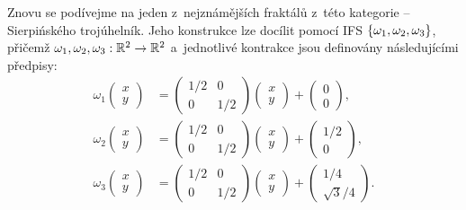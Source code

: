 Znovu se podívejme na jeden z~nejznámějších fraktálů z~této kategorie -- Sierpińského trojúhelník. Jeho konstrukce lze docílit pomocí IFS $\left\{\omega_1,\omega_2,\omega_3\right\}$, přičemž $\omega_1,\omega_2,\omega_3:\mathbb{R}^2 \rightarrow \mathbb{R}^2$ a~jednotlivé kontrakce jsou definovány následujícími předpisy:
\begin{align*}
    \omega_1\left(\begin{matrix}
        x\\
        y
    \end{matrix}\right)&=\left(\begin{matrix}
        1/2 & 0\\
        0 & 1/2
    \end{matrix}\right)\left(\begin{matrix}
        x\\
        y
    \end{matrix}\right)+\left(\begin{matrix}
        0\\
        0
    \end{matrix}\right),\\
    \omega_2\left(\begin{matrix}
        x\\
        y
    \end{matrix}\right)&=\left(\begin{matrix}
        1/2 & 0\\
        0 & 1/2
    \end{matrix}\right)\left(\begin{matrix}
        x\\
        y
    \end{matrix}\right)+\left(\begin{matrix}
        1/2\\
        0
    \end{matrix}\right),\\
    \omega_3\left(\begin{matrix}
        x\\
        y
    \end{matrix}\right)&=\left(\begin{matrix}
        1/2 & 0\\
        0 & 1/2
    \end{matrix}\right)\left(\begin{matrix}
        x\\
        y
    \end{matrix}\right)+\left(\begin{matrix}
        1/4\\
        \sqrt{3}/4
    \end{matrix}\right).
\end{align*}

